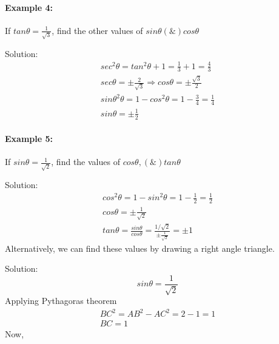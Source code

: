 \documentclass{article}
\begin{document}
\paragraph{Example 4:}
If $tan\theta = \frac{1}{\sqrt{3}}$, find the other values of $sin\theta (\&) cos\theta$

Solution:
\[
  \begin{aligned}
    sec^{2}\theta = tan^{2}\theta + 1 = \frac{1}{3}+1 = \frac{4}{3} \\
    sec\theta = \pm\frac{2}{\sqrt{3}} \Rightarrow cos\theta = \pm \frac{\sqrt{3}}{2} \\
    sin\theta^{2}\theta = 1 - cos^{2}\theta = 1 - \frac{3}{4} = \frac{1}{4} \\
    sin\theta = \pm\frac{1}{2}
  \end{aligned}
\]

\paragraph{Example 5:}
If $sin\theta = \frac{1}{\sqrt{2}}$, find the values of $cos\theta, (\&) tan\theta$

Solution:
\[
  \begin{aligned}
    cos^{2}\theta = 1 - sin^{2}\theta = 1 - \frac{1}{2} = \frac{1}{2} \\
    cos\theta = \pm\frac{1}{\sqrt{2}} \\
    tan\theta = \frac{sin\theta}{cos\theta} = \frac{1/\sqrt{2}}{\pm\frac{1}{\sqrt{2}}} = \pm 1
  \end{aligned}
\]
Alternatively, we can find these values by drawing a right angle triangle.

\begin{center}
\end{center}

Solution:
\[ sin\theta = \frac{1}{\sqrt{2}} \]
Applying Pythagoras theorem
\[
  \begin{aligned}
    BC^{2} = AB^{2} - AC^{2} = 2 - 1 = 1 \\
    BC = 1
  \end{aligned}
\]
Now,
\end{document}
